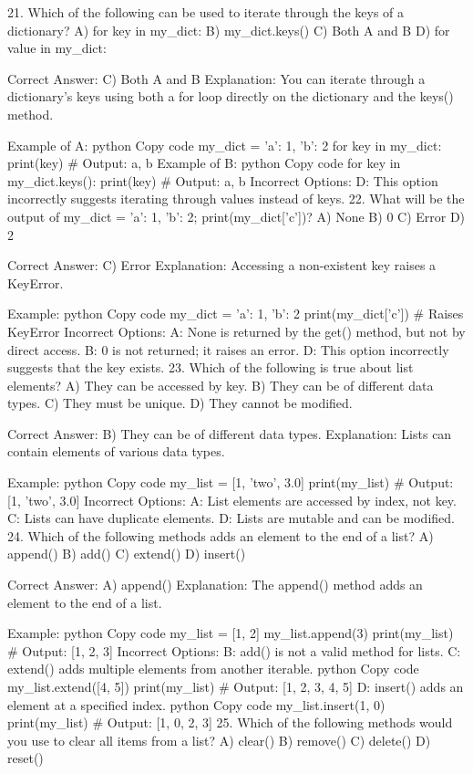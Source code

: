 21. Which of the following can be used to iterate through the keys of a dictionary?
A) for key in my_dict:
B) my_dict.keys()
C) Both A and B
D) for value in my_dict:

Correct Answer: C) Both A and B
Explanation: You can iterate through a dictionary's keys using both a for loop directly on the dictionary and the keys() method.

Example of A:
python
Copy code
my_dict = {'a': 1, 'b': 2}
for key in my_dict:
    print(key)  # Output: a, b
Example of B:
python
Copy code
for key in my_dict.keys():
    print(key)  # Output: a, b
Incorrect Options:
D: This option incorrectly suggests iterating through values instead of keys.
22. What will be the output of my_dict = {'a': 1, 'b': 2}; print(my_dict['c'])?
A) None
B) 0
C) Error
D) 2

Correct Answer: C) Error
Explanation: Accessing a non-existent key raises a KeyError.

Example:
python
Copy code
my_dict = {'a': 1, 'b': 2}
print(my_dict['c'])  # Raises KeyError
Incorrect Options:
A: None is returned by the get() method, but not by direct access.
B: 0 is not returned; it raises an error.
D: This option incorrectly suggests that the key exists.
23. Which of the following is true about list elements?
A) They can be accessed by key.
B) They can be of different data types.
C) They must be unique.
D) They cannot be modified.

Correct Answer: B) They can be of different data types.
Explanation: Lists can contain elements of various data types.

Example:
python
Copy code
my_list = [1, 'two', 3.0]
print(my_list)  # Output: [1, 'two', 3.0]
Incorrect Options:
A: List elements are accessed by index, not key.
C: Lists can have duplicate elements.
D: Lists are mutable and can be modified.
24. Which of the following methods adds an element to the end of a list?
A) append()
B) add()
C) extend()
D) insert()

Correct Answer: A) append()
Explanation: The append() method adds an element to the end of a list.

Example:
python
Copy code
my_list = [1, 2]
my_list.append(3)
print(my_list)  # Output: [1, 2, 3]
Incorrect Options:
B: add() is not a valid method for lists.
C: extend() adds multiple elements from another iterable.
python
Copy code
my_list.extend([4, 5])
print(my_list)  # Output: [1, 2, 3, 4, 5]
D: insert() adds an element at a specified index.
python
Copy code
my_list.insert(1, 0)
print(my_list)  # Output: [1, 0, 2, 3]
25. Which of the following methods would you use to clear all items from a list?
A) clear()
B) remove()
C) delete()
D) reset()

